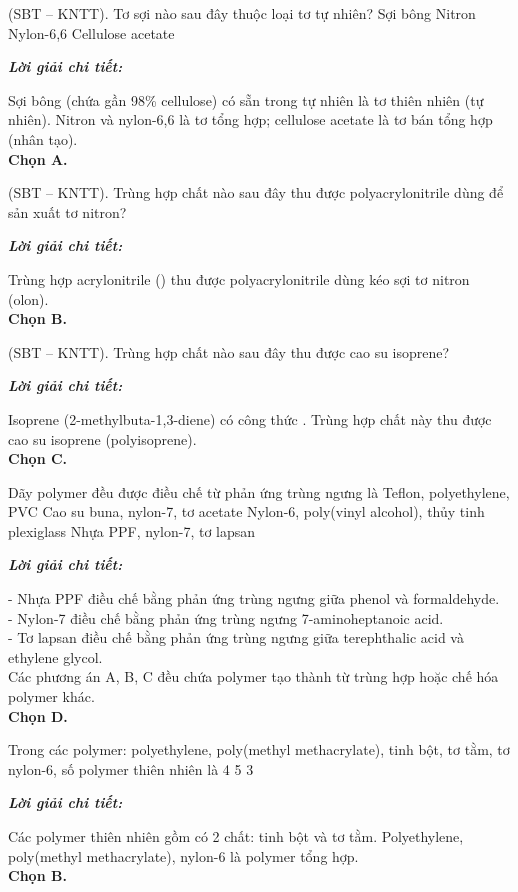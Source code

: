 \documentclass[11pt,a4paper]{article}
\def\loigiai#1{
\par\begingroup\color{blue!80!black}\small
\noindent\textbf{\textit{Lời giải chi tiết:}}\par
#1\par\endgroup}
\begin{document}
\begin{ex}
(SBT -- KNTT). Tơ sợi nào sau đây thuộc loại tơ tự nhiên?
\choice
{\True Sợi bông}
{Nitron}
{Nylon-6,6}
{Cellulose acetate}
\loigiai{
Sợi bông (chứa gần 98\% cellulose) có sẵn trong tự nhiên là tơ thiên nhiên (tự nhiên). Nitron và nylon-6,6 là tơ tổng hợp; cellulose acetate là tơ bán tổng hợp (nhân tạo).\\
\textbf{Chọn A.}}
\end{ex}

\begin{ex}
(SBT -- KNTT). Trùng hợp chất nào sau đây thu được polyacrylonitrile dùng để sản xuất tơ nitron?
\choice
{}
{\True {}}
{}
{}
\loigiai{
Trùng hợp acrylonitrile (\ce{CH2=CH-CN}) thu được polyacrylonitrile dùng kéo sợi tơ nitron (olon).\\
\textbf{Chọn B.}}
\end{ex}

\begin{ex}
(SBT -- KNTT). Trùng hợp chất nào sau đây thu được cao su isoprene?
\choice
{}
{}
{\True {}}
{}
\loigiai{
Isoprene (2-methylbuta-1,3-diene) có công thức \ce{CH2=C(CH3)-CH=CH2}. Trùng hợp chất này thu được cao su isoprene (polyisoprene).\\
\textbf{Chọn C.}}
\end{ex}

\begin{ex}
Dãy polymer đều được điều chế từ phản ứng trùng ngưng là
\choice
{Teflon, polyethylene, PVC}
{Cao su buna, nylon-7, tơ acetate}
{Nylon-6, poly(vinyl alcohol), thủy tinh plexiglass}
{\True Nhựa PPF, nylon-7, tơ lapsan}
\loigiai{
- Nhựa PPF điều chế bằng phản ứng trùng ngưng giữa phenol và formaldehyde.\\
- Nylon-7 điều chế bằng phản ứng trùng ngưng 7-aminoheptanoic acid.\\
- Tơ lapsan điều chế bằng phản ứng trùng ngưng giữa terephthalic acid và ethylene glycol.\\
Các phương án A, B, C đều chứa polymer tạo thành từ trùng hợp hoặc chế hóa polymer khác.\\
\textbf{Chọn D.}}
\end{ex}



\begin{ex}
Trong các polymer: polyethylene, poly(methyl methacrylate), tinh bột, tơ tằm, tơ nylon-6, số polymer thiên nhiên là
\choice
{4}
{}
{5}
{3}
\loigiai{
Các polymer thiên nhiên gồm có 2 chất: tinh bột và tơ tằm. Polyethylene, poly(methyl methacrylate), nylon-6 là polymer tổng hợp.\\
\textbf{Chọn B.}}
\end{ex}
\end{document}
